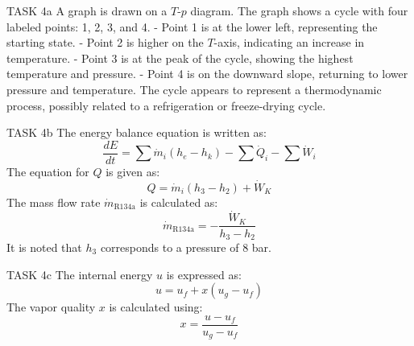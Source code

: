 TASK 4a  
A graph is drawn on a \( T \)-\( p \) diagram. The graph shows a cycle with four labeled points: 1, 2, 3, and 4.  
- Point 1 is at the lower left, representing the starting state.  
- Point 2 is higher on the \( T \)-axis, indicating an increase in temperature.  
- Point 3 is at the peak of the cycle, showing the highest temperature and pressure.  
- Point 4 is on the downward slope, returning to lower pressure and temperature.  
The cycle appears to represent a thermodynamic process, possibly related to a refrigeration or freeze-drying cycle.  

TASK 4b  
The energy balance equation is written as:  
\[
\frac{dE}{dt} = \sum \dot{m}_i (h_e - h_k) - \sum \dot{Q}_i - \sum \dot{W}_i
\]  
The equation for \( Q \) is given as:  
\[
Q = \dot{m}_i (h_3 - h_2) + \dot{W}_K
\]  
The mass flow rate \( \dot{m}_{\text{R134a}} \) is calculated as:  
\[
\dot{m}_{\text{R134a}} = -\frac{\dot{W}_K}{h_3 - h_2}
\]  
It is noted that \( h_3 \) corresponds to a pressure of 8 bar.  

TASK 4c  
The internal energy \( u \) is expressed as:  
\[
u = u_f + x (u_g - u_f)
\]  
The vapor quality \( x \) is calculated using:  
\[
x = \frac{u - u_f}{u_g - u_f}
\]
